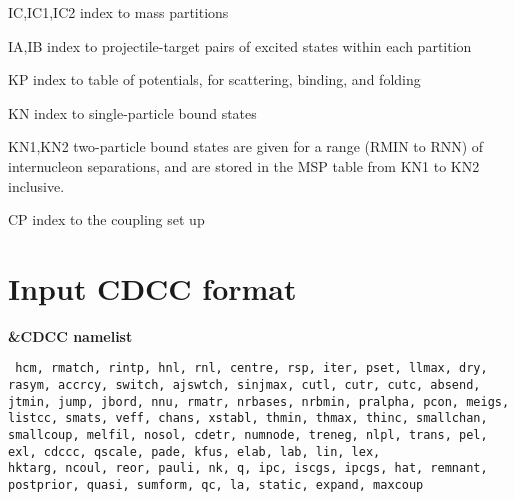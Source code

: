 \documentclass[11pt]{article}
\begin{document}
IC,IC1,IC2    index to mass partitions

IA,IB         index to projectile-target pairs of excited states
              within each partition

KP            index to table of potentials, for scattering, binding,
              and folding

KN            index to single-particle bound states

KN1,KN2       two-particle bound states are given for a range (RMIN to
              RNN) of internucleon separations, and are stored in the
              MSP table from KN1 to KN2 inclusive.

CP            index to the coupling set up

\newpage
\section{Input CDCC format}

{\bf \&CDCC namelist}

{\tt
hcm, rmatch, rintp, hnl, rnl, centre,  rsp, iter, pset, llmax,  dry,
rasym, accrcy, switch, ajswtch, sinjmax,  cutl, cutr, cutc,
absend, jtmin, jump, jbord, nnu,  rmatr, nrbases, nrbmin,  pralpha, pcon,  meigs,
listcc, smats, veff, chans, xstabl, thmin, thmax, thinc,
smallchan, smallcoup, melfil, nosol, cdetr, numnode, treneg,
nlpl, trans, pel, exl, cdccc, qscale, pade, kfus,
elab,  lab, lin, lex, \\
 hktarg, ncoul, reor, pauli,  nk,
q, ipc, iscgs, ipcgs,  hat, remnant, postprior, quasi,
sumform, qc, la, static, expand, maxcoup
}\\

\vspace{-3mm}
\end{document}
